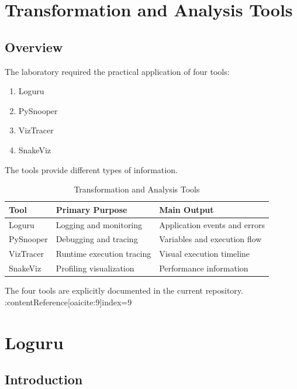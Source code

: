 \documentclass[12pt,a4paper]{report}
\begin{document}
\chapter{Transformation and Analysis Tools}

\section{Overview}

The laboratory required the practical application of four tools:

\begin{enumerate}
    \item Loguru
    \item PySnooper
    \item VizTracer
    \item SnakeViz
\end{enumerate}

The tools provide different types of information.

\begin{table}[H]
\centering
\caption{Transformation and Analysis Tools}
\begin{tabular}{p{3cm}p{5cm}p{4cm}}
\toprule
\textbf{Tool} & \textbf{Primary Purpose} & \textbf{Main Output} \\
\midrule
Loguru & Logging and monitoring & Application events and errors \\
PySnooper & Debugging and tracing & Variables and execution flow \\
VizTracer & Runtime execution tracing & Visual execution timeline \\
SnakeViz & Profiling visualization & Performance information \\
\bottomrule
\end{tabular}
\end{table}

The four tools are explicitly documented in the current repository. :contentReference[oaicite:9]{index=9}


\chapter{Loguru}

\section{Introduction}
\end{document}
